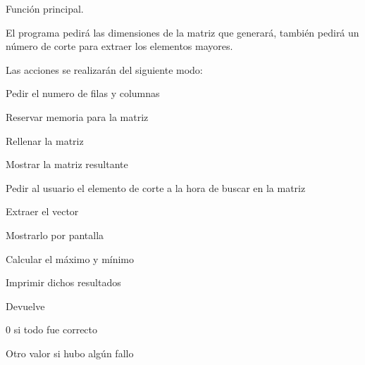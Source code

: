 Función principal. 

El programa pedirá las dimensiones de la matriz que generará, también pedirá un número de corte para extraer los elementos mayores. \par
Las acciones se realizarán del siguiente modo\-:

\begin{DoxyItemize}
\item Pedir el numero de filas y columnas \item Reservar memoria para la matriz \item Rellenar la matriz \item Mostrar la matriz resultante \item Pedir al usuario el elemento de corte a la hora de buscar en la matriz \item Extraer el vector \item Mostrarlo por pantalla \item Calcular el máximo y mínimo \item Imprimir dichos resultados\end{DoxyItemize}
\begin{DoxyReturn}{Devuelve}
\begin{DoxyItemize}
\item 0 si todo fue correcto \item Otro valor si hubo algún fallo \end{DoxyItemize}

\end{DoxyReturn}
